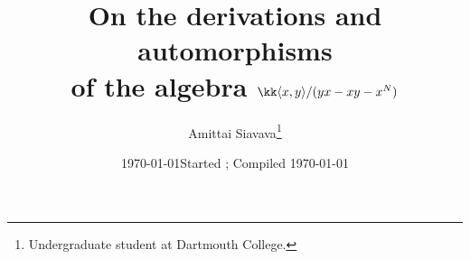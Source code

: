 

\title{%
  On the derivations and automorphisms\\
  of the algebra $\kk\langle x,y\rangle/(yx-xy-x^N)$
}
\author{Amittai Siavava\thanks{%
    Undergraduate student at Dartmouth College.
  }
}
\ifoptionfinal
  {\date{\today}}
  \date{Started ; Compiled \today}


\maketitle

\tableofcontents

